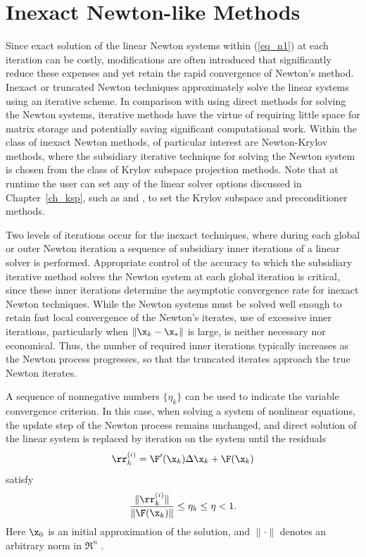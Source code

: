 \section{Inexact Newton-like Methods}

Since exact solution of the linear Newton systems within (\ref{eq_n1}) 
at each iteration can be costly, modifications 
are often introduced that significantly reduce these expenses and 
yet retain the rapid convergence of Newton's method.  Inexact or 
truncated Newton techniques approximately solve the linear systems 
using an iterative scheme.  In comparison with using direct methods 
for solving the Newton systems, iterative methods have the virtue 
of requiring little space for matrix storage and potentially saving 
significant computational work.  Within the class of inexact Newton 
methods, of particular interest are Newton-Krylov methods, where the 
subsidiary iterative technique for solving the Newton system is 
chosen from the class of Krylov subspace projection methods. 
Note that at runtime the user can set any of the linear solver
options discussed in Chapter~\ref{ch_ksp}, such as 
 and ,
to set the Krylov subspace and preconditioner methods.

Two levels of iterations occur for the inexact techniques, where 
during each global or outer Newton iteration a sequence of 
subsidiary inner iterations of a linear solver is performed.
Appropriate control of the accuracy to which the subsidiary 
iterative method solves the Newton system
at each global iteration is critical, since these 
inner iterations determine the asymptotic convergence rate for 
inexact Newton techniques.
While the Newton systems must be solved well enough to retain
fast local convergence of the Newton's iterates, use of excessive
inner iterations, particularly when $ \| \x_k - \x_* \| $ is large,
is neither necessary nor economical.
Thus, the number of required inner iterations typically increases
as the Newton process progresses, so that the truncated iterates
approach the true Newton iterates.

A sequence of nonnegative numbers $ \{\eta_k\} $ can be used to 
indicate the variable convergence criterion.
In this case, when solving a system of nonlinear equations, the 
update step of the Newton process remains unchanged, and direct 
solution of the linear system is replaced by iteration on the 
system until the residuals
\[  \rr_k^{(i)} =  \F'(\x_k) \Delta \x_k + \F(\x_k) \]
satisfy
\[  \frac{ \| \rr_k^{(i)} \| }{ \| \F(\x_k) \| } \leq \eta_k \leq \eta < 1. \]
Here $ \x_0 $ is an initial approximation of the solution, and
$ \| \cdot \| $ denotes an arbitrary norm in $ \Re^n $ .  

